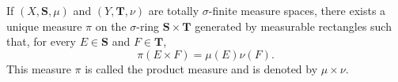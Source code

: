 If $(X, \mathbf{S}, \mu)$ and $(Y, \mathbf{T}, \nu)$ are totally $\sigma$-finite measure spaces, there exists a unique measure $\pi$ on the $\sigma$-ring $\mathbf{S} \times \mathbf{T}$ generated by measurable rectangles such that, for every $E \in \mathbf{S}$ and $F \in \mathbf{T}$,
$$\pi(E \times F) = \mu(E) \nu(F).$$
This measure $\pi$ is called the product measure and is denoted by $\mu \times \nu$.
